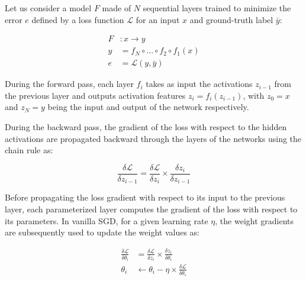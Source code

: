 \documentclass[twocolumn]{bmcart}
\begin{document}
Let us consider a model $F$ made of $N$ sequential layers trained to minimize the error $e$ defined by a loss function $\mathcal{L}$ for an input $x$ and ground-truth label $\bar{y}$:

 \begin{subequations}
 	\begin{align}
 	F &: x \rightarrow y \\
 	y &= f_N \circ ... \circ f_2 \circ f_1(x) \\
 	e &=  \mathcal{L}(y, \bar{y})
 	\end{align}
 \end{subequations}

During the forward pass, each layer $f_i$ takes as input the activations $z_{i-1}$ from the previous layer and outputs activation features $z_i=f_i(z_{i-1})$, with $z_0=x$ and $z_N=y$ being the input and output of the network respectively.

During the backward pass, the gradient of the loss with respect to the hidden activations are propagated backward through the layers of the networks using the chain rule as:


\begin{equation}
\frac{\delta \mathcal{L}}{\delta z_{i-1}} = \frac{\delta \mathcal{L}}{\delta z_{i}}  \times \frac{\delta z_{i}}{\delta z_{i-1}}
\end{equation}

Before propagating the loss gradient with respect to its input to the previous layer,
each parameterized layer computes the gradient of the loss with respect to its parameters.
In vanilla SGD, for a given learning rate $\eta$, the weight gradients are subsequently used to update the weight values as:

\begin{subequations}
\begin{align}
\frac{\delta \mathcal{L}}{\delta \theta_i} & =\frac{\delta \mathcal{L}}{\delta z_{i}}  \times \frac{\delta z_{i}}{\delta \theta_i} \\
\theta_i & \leftarrow \theta_i - \eta \times \frac{\delta \mathcal{L}}{\delta \theta_i}
\end{align}
\end{subequations}
\end{document}
